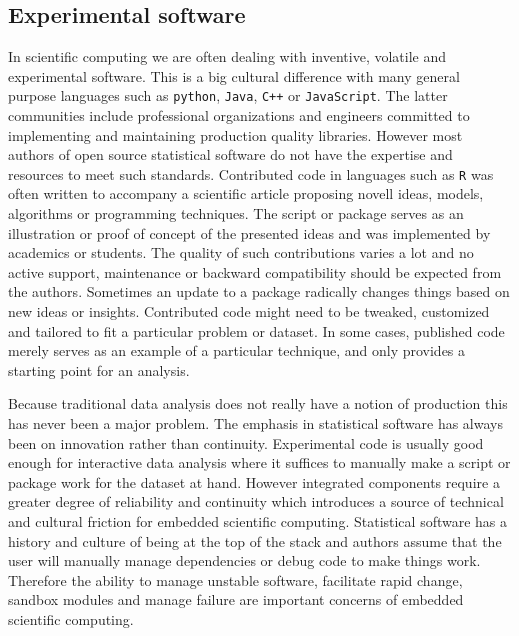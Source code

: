 \subsection{Experimental software}

In scientific computing we are often dealing with inventive, volatile and experimental  software. This is a big cultural difference with many general purpose languages such as \texttt{python}, \texttt{Java}, \texttt{C++} or \texttt{JavaScript}. The latter communities include professional organizations and engineers committed to implementing and maintaining production quality libraries. However most authors of open source statistical software do not have the expertise and resources to meet such standards. Contributed code in languages such as \texttt{R} was often written to accompany a scientific article proposing novell ideas, models, algorithms or programming techniques. The script or package serves as an illustration or proof of concept of the presented ideas and was implemented by academics or students. The quality of such contributions varies a lot and no active support, maintenance or backward compatibility should be expected from the authors. Sometimes an update to a package radically changes things based on new ideas or insights. Contributed code might need to be tweaked, customized and tailored to fit a particular problem or dataset. In some cases, published code merely serves as an example of a particular technique, and only provides a starting point for an analysis. 

Because traditional data analysis does not really have a notion of production this has never been a major problem. The emphasis in statistical software has always been on innovation rather than continuity. Experimental code is usually good enough for interactive data analysis where it suffices to manually make a script or package work for the dataset at hand. However integrated components require a greater degree of reliability and continuity which introduces a source of technical and cultural friction for embedded scientific computing. Statistical software has a history and culture of being at the top of the stack and authors assume that the user will manually manage dependencies or debug code to make things work. 
Therefore the ability to manage unstable software, facilitate rapid change, sandbox modules and manage failure are important concerns of embedded scientific computing.

